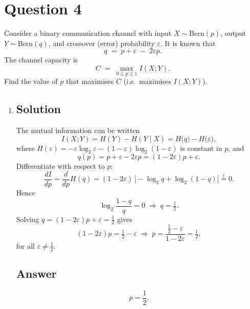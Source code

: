 \documentclass[12pt]{article}
\begin{document}
	
	\section*{Question 4}
	
	\noindent Consider a binary communication channel with input $X\sim\mathrm{Bern}(p)$, output $Y\sim\mathrm{Bern}(q)$, and crossover (error) probability $\varepsilon$.  It is known that
	\[
	q \;=\; p + \varepsilon \;-\; 2\varepsilon p.
	\]
	The channel capacity is
	\[
	C \;=\;\max_{0\le p\le1} I(X;Y).
	\]
	Find the value of $p$ that maximises $C$ (i.e.\ maximises $I(X;Y)$).
	
	\bigskip
	
	\begin{enumerate}[label={},leftmargin=0in]\item
		\subsection*{Solution}
		The mutual information can be written
		\[
		I(X;Y)
		=H(Y)-H(Y\mid X)
		=H\bigl(q\bigr)-H\bigl(\varepsilon\bigr),
		\]
		where $H(\varepsilon)=-\varepsilon\log_2\varepsilon-(1-\varepsilon)\log_2(1-\varepsilon)$ is constant in $p$, and
		\[
		q(p)=p + \varepsilon -2\varepsilon p
		=(1-2\varepsilon)p + \varepsilon.
		\]
		Differentiate with respect to $p$:
		\[
		\frac{dI}{dp}
		=\frac{d}{dp}H(q)
		=(1-2\varepsilon)\,\bigl[-\log_2 q + \log_2(1-q)\bigr]
		\stackrel{!}{=}0.
		\]
		Hence
		\[
		\log_2\frac{1-q}{q}=0
		\;\Longrightarrow\;q=\tfrac12.
		\]
		Solving $q=(1-2\varepsilon)p+\varepsilon=\tfrac12$ gives
		\[
		(1-2\varepsilon)p=\tfrac12-\varepsilon
		\;\Longrightarrow\;
		p=\frac{\tfrac12-\varepsilon}{1-2\varepsilon}
		=\tfrac12,
		\]
		for all $\varepsilon\neq\tfrac12$.
		
		\subsection*{Answer}
		\[
		\boxed{p=\frac12.}
		\]
	\end{enumerate}
	
\end{document}
